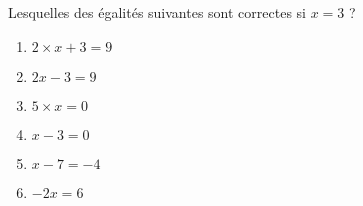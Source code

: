 
\begin{exercice}\label{exo2smath-0277}

    Lesquelles des égalités suivantes sont correctes si \( x=3\) ?
    
    \begin{multicols}{2}
        \begin{enumerate}
            \item
                \( 2\times x+3=9\)
            \item
                \( 2x-3=9\)
            \item
                \( 5\times x=0\)
            \item
                \( x-3=0\)
            \item
                \( x-7=-4\)
            \item
                \( -2x=6\)
        \end{enumerate}
    \end{multicols}

\end{exercice}
